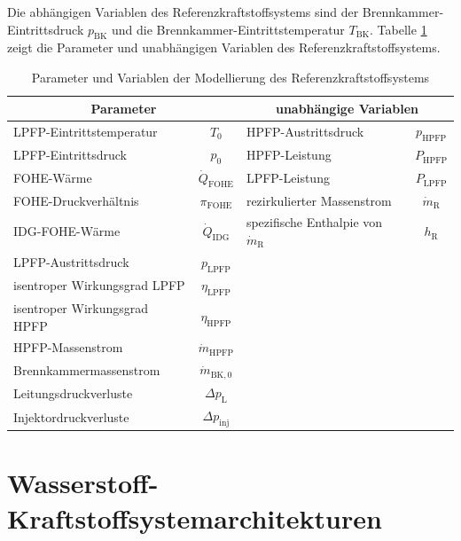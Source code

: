 Die abhängigen Variablen des Referenzkraftstoffsystems sind der Brennkammer-Eintrittsdruck $p_{\mathrm{BK}}$ und die Brennkammer-Eintrittstemperatur $T_{\mathrm{BK}}$. Tabelle \ref{Tab:referenz_params} zeigt die Parameter und unabhängigen Variablen des Referenzkraftstoffsystems.

\begin{table}[ht]
    \centering
	\caption{Parameter und Variablen der Modellierung des  Referenzkraftstoffsystems}
	\begin{tabular} {|l|c|l|c|} \hline%
		\multicolumn{2}{|c}{Parameter} & \multicolumn{2}{|c|}{unabhängige Variablen}\\ \hline\hline%
        LPFP-Eintrittstemperatur & $T_0$ & HPFP-Austrittsdruck & $p_{\mathrm{HPFP}}$ \\ \hline
        LPFP-Eintrittsdruck & $p_0$ & HPFP-Leistung & $P_{\mathrm{HPFP}}$ \\ \hline
        FOHE-Wärme & $\dot{Q}_{\mathrm{FOHE}}$ & LPFP-Leistung & $P_{\mathrm{LPFP}}$ \\ \hline
        FOHE-Druckverhältnis & $\pi_{\mathrm{FOHE}}$ & rezirkulierter Massenstrom & $\dot{m}_\mathrm{R}$ \\ \hline
        IDG-FOHE-Wärme  & $\dot{Q}_{\mathrm{IDG}}$ & spezifische Enthalpie von $\dot{m}_\mathrm{R}$ & $h_\mathrm{R}$                 \\ \hline
        LPFP-Austrittsdruck & $p_{\mathrm{LPFP}}$& \multicolumn{2}{c|}{}\\ \hline
        isentroper Wirkungsgrad LPFP & $\eta_{\mathrm{LPFP}}$& \multicolumn{2}{c|}{}\\ \hline
        isentroper Wirkungsgrad HPFP & $\eta_{\mathrm{HPFP}}$& \multicolumn{2}{c|}{}\\ \hline
        HPFP-Massenstrom & $\dot{m}_{\mathrm{HPFP}}$& \multicolumn{2}{c|}{}\\ \hline
        Brennkammermassenstrom & $\dot{m}_{\mathrm{BK},0}$& \multicolumn{2}{c|}{}\\ \hline
        Leitungsdruckverluste & $\Delta p_{\mathrm{L}}$& \multicolumn{2}{c|}{}\\ \hline
        Injektordruckverluste & $\Delta p_{\mathrm{inj}}$& \multicolumn{2}{c|}{}\\ \hline
	\end{tabular}	
    \label{Tab:referenz_params}%
\end{table}
\FloatBarrier 

\section{Wasserstoff-Kraftstoffsystemarchitekturen}

